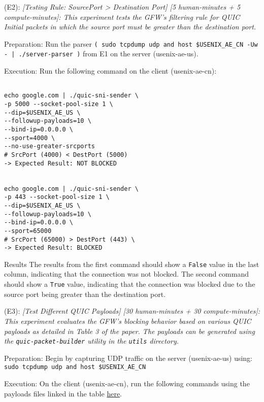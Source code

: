\begin{compactdesc}
\begin{asparadesc}
\end{asparadesc}



\item[(E2):] \textit{[Testing Rule: SourcePort > Destination Port] [5 human-minutes + 5 compute-minutes]: This experiment tests the GFW's filtering rule for QUIC Initial packets in which the source port must be greater than the destination port.}
\begin{asparadesc}
    \item[Preparation:] Run the parser \texttt{( sudo tcpdump udp and host \$USENIX\_AE\_CN -Uw - | ./server-parser )} from E1 on the server (usenix-ae-us). 
    \item[Execution:] Run the following command on the client (usenix-ae-cn):

\begin{verbatim}

echo google.com | ./quic-sni-sender \ 
-p 5000 --socket-pool-size 1 \ 
--dip=$USENIX_AE_US \
--followup-payloads=10 \ 
--bind-ip=0.0.0.0 \
--sport=4000 \
--no-use-greater-srcports 
# SrcPort (4000) < DestPort (5000) 
-> Expected Result: NOT BLOCKED


echo google.com | ./quic-sni-sender \ 
-p 443 --socket-pool-size 1 \ 
--dip=$USENIX_AE_US \
--followup-payloads=10 \ 
--bind-ip=0.0.0.0 \
--sport=65000 
# SrcPort (65000) > DestPort (443) \ 
-> Expected Result: BLOCKED

\end{verbatim}
        \item [Results] The results from the first command should show a \texttt{False} value in the last column, indicating that the connection was not blocked. The second command should show a \texttt{True} value, indicating that the connection was blocked due to the source port being greater than the destination port. 


    \end{asparadesc}

    \item[(E3):] \textit{[Test Different QUIC Payloads] [30 human-minutes + 30 compute-minutes]: This experiment evaluates the GFW's blocking behavior based on various QUIC payloads as detailed in Table 3 of the paper. The payloads can be generated using the \texttt{quic-packet-builder} utility in the \texttt{utils} directory.}
    
    \begin{asparadesc}
        \item[Preparation:] Begin by capturing UDP traffic on the server (usenix-ae-us) using: \texttt{sudo tcpdump udp and host \$USENIX\_AE\_CN} 
        \item[Execution:] On the client (usenix-ae-cn), run the following commands using the payloads files linked in the table \href{https://github.com/gfw-report/usenixsecurity25-quic-sni?tab=readme-ov-file#experiment-3-testing-quic-payloads-listed-in-table-3-of-the-paper}{here}.
        

\end{asparadesc}
\end{compactdesc}
